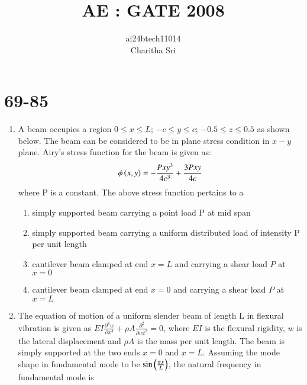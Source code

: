 \documentclass[journal,12pt,onecolumn]{IEEEtran}
\theoremstyle{remark}
\begin{document}

\vspace{3cm}

\title{AE : GATE 2008}
\author{ai24btech11014 \\ Charitha Sri}

\maketitle
\bigskip       
\renewcommand{\thefigure}{\theenumi}
\renewcommand{\thetable}{\theenumi}

\section{ 69-85}

\begin{enumerate}
\item A beam occupies a region $0\leq x \leq L$; $-c \leq y \leq c$; $ -0.5 \leq z \leq 0.5 $ as shown below. The beam can be considered to be in plane stress condition in $x-y$ plane. Airy's stress function for the beam is given as:
      \begin{align}
      \phi \left(x, y\right) = -\frac{Px{y}^3}{4{c}^3}+\frac{3Pxy}{4c}
      \end{align}
      where P is a constant.
      The above stress function pertains to a 
      \begin{enumerate}
      \item simply supported beam carrying a point load P at mid span 
      \item simply supported beam carrying a uniform distributed load of intensity P per unit length 
      \item cantilever beam clamped at end $x = L$ and carrying a shear load $P$ at $x = 0$
      \item cantilever beam clamped at end $x = 0$ and carrying a shear load $P$ at $x = L$
      \end{enumerate}
\item The equation of motion of a uniform slender beam of length L in flexural vibration is given as $EI
\frac{{\partial}^4 w}{\partial {x}^{4}} + \rho A \frac{{\partial}^{2}}{\partial w {t}^{2}}=0$, where $EI$ is the flexural rigidity, $w$ is the lateral displacement and $\rho A$ is the mass per unit length. The beam is simply supported at the two ends $x =0$ and $x=L$. Assuming the mode shape in fundamental mode to be $\sin\left(\frac{{\pi x}}{L}\right)$, the natural frequency in fundamental mode is 
\begin{enumerate}
\end{enumerate}


\end{enumerate}
\end{document}
